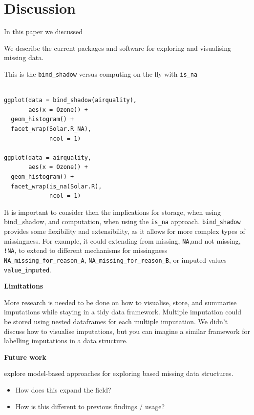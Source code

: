 \documentclass[]{article}
\providecommand{\tightlist}{%
  \setlength{\itemsep}{0pt}\setlength{\parskip}{0pt}}
\begin{document}
\section{Discussion}\label{discussion}

In this paper we discussed

We describe the current packages and software for exploring and
visualising missing data.

This is the \texttt{bind\_shadow} versus computing on the fly with
\texttt{is\_na}

\begin{verbatim}

ggplot(data = bind_shadow(airquality),
       aes(x = Ozone)) + 
  geom_histogram() + 
  facet_wrap(Solar.R_NA),
             ncol = 1)
             
ggplot(data = airquality,
       aes(x = Ozone)) + 
  geom_histogram() + 
  facet_wrap(is_na(Solar.R),
             ncol = 1)
\end{verbatim}

It is important to consider then the implications for storage, when
using bind\_shadow, and computation, when using the \texttt{is\_na}
approach. \texttt{bind\_shadow} provides some flexibility and
extensibility, as it allows for more complex types of missingness. For
example, it could extending from missing, \texttt{NA},and not missing,
\texttt{!NA}, to extend to different mechanisms for missingness
\texttt{NA\_missing\_for\_reason\_A},
\texttt{NA\_missing\_for\_reason\_B}, or imputed values
\texttt{value\_imputed}.

\textbf{Limitations}

More research is needed to be done on how to visualise, store, and
summarise imputations while staying in a tidy data framework. Multiple
imputation could be stored using nested dataframes for each multiple
imputation. We didn't discuss how to visualise imputations, but you can
imagine a similar framework for labelling imputations in a data
structure.

\textbf{Future work}

explore model-based approaches for exploring based missing data
structures.

\begin{itemize}
\tightlist
\item
  How does this expand the field?
\item
  How is this different to previous findings / usage?
\end{itemize}
\end{document}
